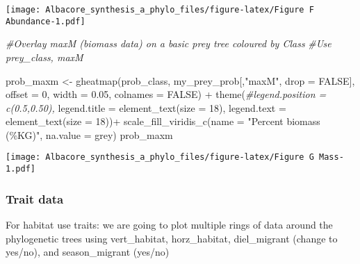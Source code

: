 \documentclass[
]{article}
\newenvironment{Shaded}{\begin{snugshade}}{\end{snugshade}}
\newcommand{\AttributeTok}[1]{\textcolor[rgb]{0.77,0.63,0.00}{#1}}
\newcommand{\CommentTok}[1]{\textcolor[rgb]{0.56,0.35,0.01}{\textit{#1}}}
\newcommand{\ConstantTok}[1]{\textcolor[rgb]{0.00,0.00,0.00}{#1}}
\newcommand{\DecValTok}[1]{\textcolor[rgb]{0.00,0.00,0.81}{#1}}
\newcommand{\FloatTok}[1]{\textcolor[rgb]{0.00,0.00,0.81}{#1}}
\newcommand{\FunctionTok}[1]{\textcolor[rgb]{0.00,0.00,0.00}{#1}}
\newcommand{\NormalTok}[1]{#1}
\newcommand{\OtherTok}[1]{\textcolor[rgb]{0.56,0.35,0.01}{#1}}
\newcommand{\SpecialCharTok}[1]{\textcolor[rgb]{0.00,0.00,0.00}{#1}}
\newcommand{\StringTok}[1]{\textcolor[rgb]{0.31,0.60,0.02}{#1}}
\begin{document}
\texttt{[image: Albacore\_synthesis\_a\_phylo\_files/figure-latex/Figure F Abundance-1.pdf]}

\begin{Shaded}
\begin{Highlighting}[]
\CommentTok{\#Overlay maxM (biomass data) on a basic prey tree coloured by Class}
\CommentTok{\#Use prey\_class, maxM}

\NormalTok{prob\_maxm }\OtherTok{\textless{}{-}} \FunctionTok{gheatmap}\NormalTok{(prob\_class, my\_prey\_prob[,}\StringTok{"maxM"}\NormalTok{, }\AttributeTok{drop =} \ConstantTok{FALSE}\NormalTok{], }
                      \AttributeTok{offset =} \DecValTok{0}\NormalTok{, }\AttributeTok{width =} \FloatTok{0.05}\NormalTok{, }\AttributeTok{colnames =} \ConstantTok{FALSE}\NormalTok{) }\SpecialCharTok{+}
  \FunctionTok{theme}\NormalTok{(}\CommentTok{\#legend.position = c(0.5,0.50),}
        \AttributeTok{legend.title =} \FunctionTok{element\_text}\NormalTok{(}\AttributeTok{size =} \DecValTok{18}\NormalTok{), }
        \AttributeTok{legend.text =} \FunctionTok{element\_text}\NormalTok{(}\AttributeTok{size =} \DecValTok{18}\NormalTok{))}\SpecialCharTok{+}
  \FunctionTok{scale\_fill\_viridis\_c}\NormalTok{(}\AttributeTok{name =} \StringTok{"Percent biomass (\%KG)"}\NormalTok{, }\AttributeTok{na.value =} \StringTok{\textquotesingle{}grey\textquotesingle{}}\NormalTok{)}
\NormalTok{prob\_maxm}
\end{Highlighting}
\end{Shaded}

\texttt{[image: Albacore\_synthesis\_a\_phylo\_files/figure-latex/Figure G Mass-1.pdf]}

\hypertarget{trait-data}{%
\subsubsection{Trait data}\label{trait-data}}

For habitat use traits: we are going to plot multiple rings of data
around the phylogenetic trees using vert\_habitat, horz\_habitat,
diel\_migrant (change to yes/no), and season\_migrant (yes/no)
\end{document}

